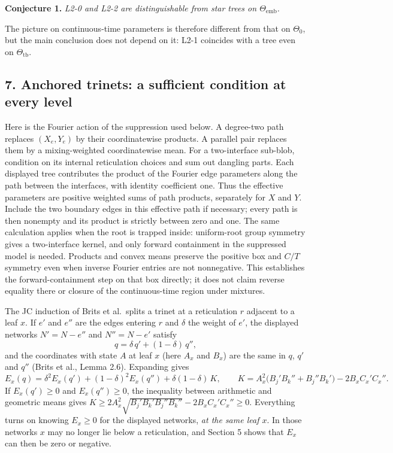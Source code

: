 \documentclass[
  11pt,
]{article}
\newcounter{none} %
\begin{document}
\textbf{Conjecture 1.} \emph{L2-0 and L2-2 are distinguishable from star
trees on \(\Theta_{\mathrm{emb}}\).}

The picture on continuous-time parameters is therefore different from
that on \(\Theta_0\), but the main conclusion does not depend on it:
L2-1 coincides with a tree even on \(\Theta_{\mathrm{tb}}\).

\subsection{7. Anchored trinets: a sufficient condition at every
level}\label{anchored-trinets-a-sufficient-condition-at-every-level}

Here is the Fourier action of the suppression used below. A degree-two
path replaces \((X_e,Y_e)\) by their coordinatewise products. A parallel
pair replaces them by a mixing-weighted coordinatewise mean. For a
two-interface sub-blob, condition on its internal reticulation choices
and sum out dangling parts. Each displayed tree contributes the product
of the Fourier edge parameters along the path between the interfaces,
with identity coefficient one. Thus the effective parameters are
positive weighted sums of path products, separately for \(X\) and \(Y\).
Include the two boundary edges in this effective path if necessary;
every path is then nonempty and its product is strictly between zero and
one. The same calculation applies when the root is trapped inside:
uniform-root group symmetry gives a two-interface kernel, and only
forward containment in the suppressed model is needed. Products and
convex means preserve the positive box and \(C/T\) symmetry even when
inverse Fourier entries are not nonnegative. This establishes the
forward-containment step on that box directly; it does not claim reverse
equality there or closure of the continuous-time region under mixtures.

The JC induction of Brits et al.~splits a trinet at a reticulation \(r\)
adjacent to a leaf \(x\). If \(e'\) and \(e''\) are the edges entering
\(r\) and \(\delta\) the weight of \(e'\), the displayed networks
\(N' = N - e''\) and \(N'' = N-e'\) satisfy
\[q = \delta\,q' + (1-\delta)\,q'' ,\] and the coordinates with state
\(A\) at leaf \(x\) (here \(A_x\) and \(B_x\)) are the same in \(q\),
\(q'\) and \(q''\) (Brits et al., Lemma 2.6). Expanding gives
\[E_x(q) = \delta^2E_x(q') + (1-\delta)^2E_x(q'') + \delta(1-\delta)\,K,\qquad K = A_x^2\bigl(B_j'B_k''+B_j''B_k'\bigr) - 2B_xC_x'C_x'' .\]
If \(E_x(q')\ge 0\) and \(E_x(q'')\ge0\), the inequality between
arithmetic and geometric means gives
\(K \ge 2A_x^2\sqrt{B_j'B_k'B_j''B_k''} - 2B_xC_x'C_x'' \ge 0\).
Everything turns on knowing \(E_x\ge0\) for the displayed networks,
\emph{at the same leaf \(x\)}. In those networks \(x\) may no longer lie
below a reticulation, and Section 5 shows that \(E_x\) can then be zero
or negative.
\end{document}
